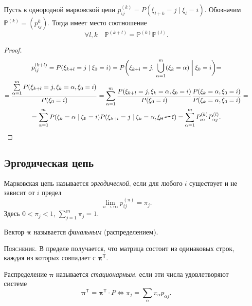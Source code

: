 \begin{theorem}
  Пусть в однородной марковской цепи $p_{ij}^{(k)} = P(\xi_{l+k} = j \mid
  \xi_l=i)$. Обозначим
  $\mathbb{P}^{(k)} = (p_{ij}^k)$. Тогда имеет место соотношение
  \[
    \forall l, k \quad \mathbb{P}^{(k+l)} = \mathbb{P}^{(k)} \mathbb{P}^{(l)}.
  \]
\end{theorem}
\begin{proof}
  \begin{multline*}
    p_{ij}^{(k+l)} = P(\xi_{k+l}=j \mid \xi_0 = i)
    = P\biggl(\xi_{k+l}=j,\, \bigcup_{\alpha=1}^m (\xi_k=\alpha) \biggm| \xi_0 =
      i\biggl) = \\
    = \dfrac{\sum\limits_{\alpha=1}^m P(\xi_{k+l} = j, \xi_k = \alpha, \xi_0=i)}{P(\xi_0=i)}
    = \sum_{\alpha=1}^m \dfrac{P(\xi_{k+l} = j, \xi_k = \alpha, \xi_0=i)}{P(\xi_0=i)} \dfrac{P(\xi_k=\alpha, \xi_0=i)}{P(\xi_k=\alpha, \xi_0=i)} = \\
    = \sum_{\alpha=1}^m P(\xi_k=\alpha\mid\xi_0=i) P(\xi_{k+l}=j \mid \xi_k = \alpha, \cancel{\xi_0=i})
    = \sum_{\alpha=1}^m P_{i\alpha}^{(k)} P_{\alpha j}^{(l)}.
  \end{multline*}
\end{proof}

\subsection{Эргодическая цепь}

\begin{definition}
  Марковская цепь называется \emph{эргодической}, если для любого $ i $ существует и не зависит
  от $ i $ предел
  \[
    \lim_{n\to\infty} p_{ij}^{(n)} = \pi_{j}.
  \]
  Здесь $0 < \pi_j < 1$, $\sum\limits_{j=1}^m \pi_j = 1$.

  Вектор $\bm{\pi}$ называется \emph{финальным} (распределением).
\end{definition}

\textsc{Пояснение}.\hspace{.1em} В пределе получается, что матрица состоит из одинаковых строк, каждая из
которых совпадает с $\bm{\pi}^{\mathsf T}$.

\begin{definition}
  Распределение $\bm{\pi}$ называется \emph{стационарным}, если эти числа удовлетворяют
  системе
  \[
    \bm{\pi}^{\mathsf T} = \bm{\pi}^{\mathsf T} \cdot P
    \Leftrightarrow 
    \pi_j = \sum_\alpha \pi_\alpha p_{\alpha j}.
  \]
\end{definition}

